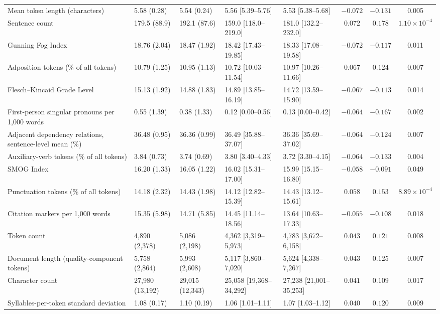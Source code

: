\begin{landscape}
\begin{longtable}{@{}p{5.2cm}p{2.65cm}p{2.65cm}p{2.85cm}p{2.85cm}ccc@{}}
Mean token length (characters) & 5.58 (0.28) & 5.54 (0.24) & 5.56 [5.39--5.76] & 5.53 [5.38--5.68] & $-0.072$ & $-0.131$ & 0.005 \\
Sentence count & 179.5 (88.9) & 192.1 (87.6) & 159.0 [118.0--219.0] & 181.0 [132.2--232.0] & $0.072$ & $0.178$ & $1.10 \times 10^{-4}$ \\
Gunning Fog Index & 18.76 (2.04) & 18.47 (1.92) & 18.42 [17.43--19.85] & 18.33 [17.08--19.58] & $-0.072$ & $-0.117$ & 0.011 \\
Adposition tokens (\% of all tokens) & 10.79 (1.25) & 10.95 (1.13) & 10.72 [10.03--11.54] & 10.97 [10.26--11.66] & $0.067$ & $0.124$ & 0.007 \\
Flesch--Kincaid Grade Level & 15.13 (1.92) & 14.88 (1.83) & 14.89 [13.85--16.19] & 14.72 [13.59--15.90] & $-0.067$ & $-0.113$ & 0.014 \\
First-person singular pronouns per 1,000 words & 0.55 (1.39) & 0.38 (1.33) & 0.12 [0.00--0.56] & 0.13 [0.00--0.42] & $-0.064$ & $-0.167$ & 0.002 \\
Adjacent dependency relations, sentence-level mean (\%) & 36.48 (0.95) & 36.36 (0.99) & 36.49 [35.88--37.07] & 36.36 [35.69--37.02] & $-0.064$ & $-0.124$ & 0.007 \\
Auxiliary-verb tokens (\% of all tokens) & 3.84 (0.73) & 3.74 (0.69) & 3.80 [3.40--4.33] & 3.72 [3.30--4.15] & $-0.064$ & $-0.133$ & 0.004 \\
SMOG Index & 16.20 (1.33) & 16.05 (1.22) & 16.02 [15.31--17.00] & 15.99 [15.15--16.80] & $-0.058$ & $-0.091$ & 0.049 \\
Punctuation tokens (\% of all tokens) & 14.18 (2.32) & 14.43 (1.98) & 14.12 [12.82--15.39] & 14.43 [13.12--15.61] & $0.058$ & $0.153$ & $8.89 \times 10^{-4}$ \\
Citation markers per 1,000 words & 15.35 (5.98) & 14.71 (5.85) & 14.45 [11.14--18.56] & 13.64 [10.63--17.33] & $-0.055$ & $-0.108$ & 0.018 \\
Token count & 4,890 (2,378) & 5,086 (2,198) & 4,362 [3,319--5,973] & 4,783 [3,672--6,158] & $0.043$ & $0.121$ & 0.008 \\
Document length (quality-component tokens) & 5,758 (2,864) & 5,993 (2,608) & 5,117 [3,860--7,020] & 5,624 [4,338--7,267] & $0.043$ & $0.125$ & 0.007 \\
Character count & 27,980 (13,192) & 29,015 (12,343) & 25,058 [19,368--34,292] & 27,238 [21,001--35,253] & $0.041$ & $0.109$ & 0.017 \\
Syllables-per-token standard deviation & 1.08 (0.17) & 1.10 (0.19) & 1.06 [1.01--1.11] & 1.07 [1.03--1.12] & $0.040$ & $0.120$ & 0.009 \\

\end{longtable}
\end{landscape}
